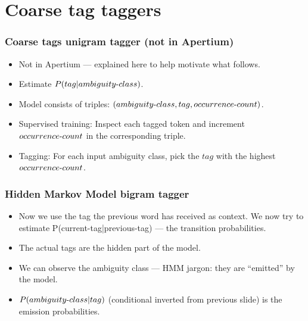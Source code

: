 \documentclass{beamer}
\begin{document}
\section{Coarse tag taggers}
\begin{frame}
\frametitle{Coarse tags unigram tagger (not in Apertium)}
\begin{itemize}

  \item Not in Apertium --- explained here to help motivate what follows.

  \item Estimate $P(tag|ambiguity\hbox{-}class)$.

  \item Model consists of triples:
    $(ambiguity\hbox{-}class,\allowbreak tag,\allowbreak
    occurrence\hbox{-}count)$.

  \item Supervised training: Inspect each tagged token and increment
    $occurrence\hbox{-}count$ in the corresponding triple.

  \item Tagging: For each input ambiguity class, pick the $tag$
    with the highest $occurrence\hbox{-}count$.

\end{itemize}
\end{frame}

\begin{frame}
\frametitle{Hidden Markov Model bigram tagger}
\begin{itemize}

  \item Now we use the tag the previous word has received as context. We
    now try to estimate
    P(current\hbox{-}tag|previous\hbox{-}tag) --- the
    transition probabilities.

  \item The actual tags are the hidden part of the model.

  \item We can observe the ambiguity class --- HMM jargon: they are ``emitted''
    by the model.

  \item $P(ambiguity\hbox{-}class|tag)$ (conditional inverted from previous slide)
    is the emission probabilities.

\end{itemize}
\end{frame}
\end{document}
